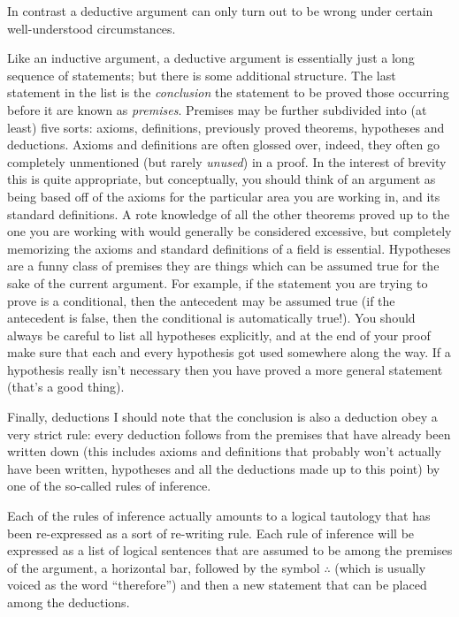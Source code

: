 \documentclass[10pt,]{book}
\theoremstyle{plain}
\theoremstyle{definition}
\theoremstyle{definition}
\numberwithin{equation}{section}
\begin{document}
    In contrast a deductive argument can only turn out to be wrong under
    certain well-understood circumstances.
\par

    Like an inductive argument, a deductive argument
    is essentially just a
    long sequence of statements; but there is some additional structure.
    The last statement in the list is the \emph{conclusion} \textemdash{} the statement
    to be proved \textemdash{} those occurring before it are known as
    \emph{premises}.
    Premises may be further subdivided into (at least) five sorts: axioms,
    definitions, previously proved theorems, hypotheses and deductions.
    Axioms and definitions are often glossed
    over, indeed, they often go completely unmentioned (but rarely \emph{unused})
    in a proof. In the interest of brevity this is quite appropriate, but
    conceptually, you should think of an argument as being based off of
    the axioms for the particular area you are working in, and its standard
    definitions. A rote knowledge of all the other theorems proved up to
    the one you are working with would generally be considered excessive,
    but completely memorizing the axioms and standard definitions of a field
    is essential. Hypotheses are a funny class of premises \textemdash{} they are things
    which can be assumed true for the sake of the current argument. For
    example, if the statement you are trying to prove is a conditional,
    then the antecedent may be assumed true (if the antecedent is false,
    then the conditional is automatically true!). You should always be
    careful to list all hypotheses explicitly, and at the end of your
    proof make sure that each and every hypothesis got used somewhere
    along the way. If a hypothesis really isn't necessary then you have
    proved a more general statement (that's a good thing).
\par

    Finally, deductions \textemdash{} I should note that the conclusion is also a
    deduction \textemdash{} obey a very strict rule: every deduction follows from
    the premises that have already been written down (this includes
    axioms and definitions that probably won't actually have been written,
    hypotheses and all the deductions made up to this point) by one of the
    so-called rules of inference.
\par

    Each of the rules of inference actually amounts to a logical tautology
    that has been re-expressed as a sort of re-writing rule. Each rule
    of inference will be expressed as a list of logical
    sentences that are assumed to be among the premises of the argument,
    a horizontal bar, followed by the symbol \(\therefore\) (which is
    usually voiced as the word ``therefore'') and then a new statement
    that can be placed among the deductions.
\par
\end{document}

